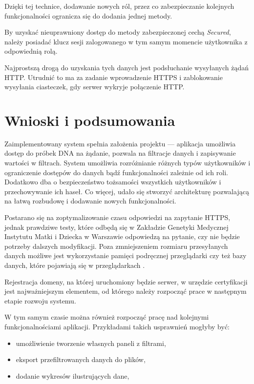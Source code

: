 \documentclass[a4paper,12pt,twoside]{article}
\begin{document}
Dzięki tej technice, dodawanie nowych ról, przez co zabezpieczanie
kolejnych funkcjonalności ogranicza się do dodania jednej metody.

By uzyskać nieuprawniony dostęp do metody zabezpieczonej cechą \textit{Secured},
należy posiadać klucz sesji zalogowanego w tym samym momencie użytkownika
z odpowiednią rolą.

Najprostszą drogą do uzyskania tych danych jest podsłuchanie wysyłanych
żądań HTTP. Utrudnić to ma za zadanie wprowadzenie HTTPS i zablokowanie wysyłania
ciasteczek, gdy serwer wykryje połączenie HTTP.

\newpage
\section{Wnioski i podsumowania}

Zaimplementowany system spełnia założenia projektu — aplikacja
umożliwia dostęp do próbek DNA na żądanie, pozwala na filtracje danych
i zapisywanie wartości w filtrach.
System umożliwia rozróżnianie różnych typów użytkowników
i ograniczenie dostępów do danych bądź funkcjonalności zależnie od ich
roli.
Dodatkowo dba o bezpieczeństwo
tożsamości wszystkich użytkowników i przechowywanie ich haseł.
Co więcej, udało się stworzyć
architekturę pozwalającą na łatwą rozbudowę
i dodawanie nowych funkcjonalności.

Postarano się na zoptymalizowanie czasu odpowiedzi na zapytanie HTTPS,
jednak prawdziwe testy, które odbędą się w Zakładzie Genetyki Medycznej Instytutu Matki i Dziecka w Warszawie odpowiedzą na pytanie, czy
nie będzie potrzeby dalszych modyfikacji. Poza zmniejszeniem
rozmiaru przesyłanych danych możliwe jest wykorzystanie pamięci podręcznej
przeglądarki czy też bazy danych, które pojawiają się w przeglądarkach \cite{w3cDatabase}.

Rejestracja domeny, na której uruchomiony będzie serwer,
w urzędzie certyfikacji jest najważniejszym elementem,
od którego należy rozpocząć prace w następnym etapie rozwoju systemu.

W tym samym czasie można również rozpocząć pracę nad kolejnymi funkcjonalnościami
aplikacji. Przykładami takich usprawnień mogłyby być:
\begin{itemize}
\item umożliwienie tworzenie własnych paneli z filtrami,
\item eksport przefiltrowanych danych do plików,
\item dodanie wykresów ilustrujących dane,
\end{itemize}
\end{document}

